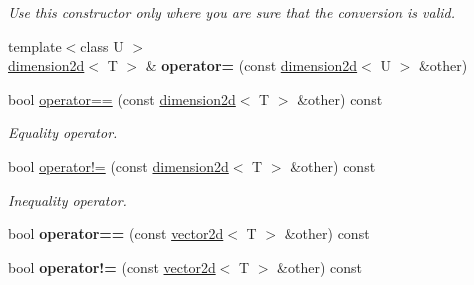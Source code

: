 \begin{DoxyCompactItemize}
\begin{DoxyCompactList}\small\item\em Use this constructor only where you are sure that the conversion is valid. \end{DoxyCompactList}\item 
{\footnotesize template$<$class U $>$ }\\\hyperlink{classirr_1_1core_1_1dimension2d}{dimension2d}$<$ T $>$ \& {\bfseries operator=} (const \hyperlink{classirr_1_1core_1_1dimension2d}{dimension2d}$<$ U $>$ \&other)\hypertarget{classirr_1_1core_1_1dimension2d_a22388905976bbcd11f32a765a601a4fd}{}\label{classirr_1_1core_1_1dimension2d_a22388905976bbcd11f32a765a601a4fd}

\item 
bool \hyperlink{classirr_1_1core_1_1dimension2d_aa8e64f2adf3d069324e6159cfb6aa82d}{operator==} (const \hyperlink{classirr_1_1core_1_1dimension2d}{dimension2d}$<$ T $>$ \&other) const \hypertarget{classirr_1_1core_1_1dimension2d_aa8e64f2adf3d069324e6159cfb6aa82d}{}\label{classirr_1_1core_1_1dimension2d_aa8e64f2adf3d069324e6159cfb6aa82d}

\begin{DoxyCompactList}\small\item\em Equality operator. \end{DoxyCompactList}\item 
bool \hyperlink{classirr_1_1core_1_1dimension2d_a76c0933b790d66cb3b0c7446bb45e089}{operator!=} (const \hyperlink{classirr_1_1core_1_1dimension2d}{dimension2d}$<$ T $>$ \&other) const \hypertarget{classirr_1_1core_1_1dimension2d_a76c0933b790d66cb3b0c7446bb45e089}{}\label{classirr_1_1core_1_1dimension2d_a76c0933b790d66cb3b0c7446bb45e089}

\begin{DoxyCompactList}\small\item\em Inequality operator. \end{DoxyCompactList}\item 
bool {\bfseries operator==} (const \hyperlink{classirr_1_1core_1_1vector2d}{vector2d}$<$ T $>$ \&other) const \hypertarget{classirr_1_1core_1_1dimension2d_a34c99e1d9d11c1e20dde2ab6a3a0bfb9}{}\label{classirr_1_1core_1_1dimension2d_a34c99e1d9d11c1e20dde2ab6a3a0bfb9}

\item 
bool {\bfseries operator!=} (const \hyperlink{classirr_1_1core_1_1vector2d}{vector2d}$<$ T $>$ \&other) const \hypertarget{classirr_1_1core_1_1dimension2d_a91d1aee9d097f3b9e7259e7a79bbd19d}{}\label{classirr_1_1core_1_1dimension2d_a91d1aee9d097f3b9e7259e7a79bbd19d}


\end{DoxyCompactItemize}
